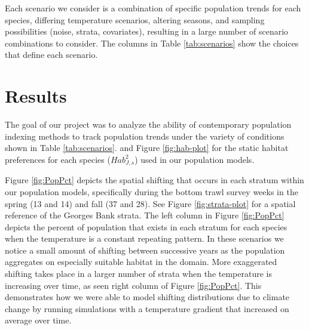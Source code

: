 \documentclass[
  12pt,
]{article}
\begin{document}
Each scenario we consider is a combination of specific population trends for each species, differing temperature scenarios, altering seasons, and sampling possibilities (noise, strata, covariates), resulting in a large number of scenario combinations to consider. The columns in Table \ref{tab:scenarios} show the choices that define each scenario.

\begin{table}

\caption{\label{tab:scenarios}Each index estimate chooses one condition from each of the following
7 columns. There are 3*3*2*2*2*2*2 = 288 VAST model combinations and 3*3*2*2*2*2 = 144 stratified mean estimates.}
\centering
{}
\end{table}

\section{Results}

The goal of our project was to analyze the ability of contemporary population indexing methods to track population trends under the variety of conditions shown in Table \ref{tab:scenarios}. and Figure \ref{fig:hab-plot} for the static habitat preferences for each species (\(Hab^2_{J,s}\)) used in our population models.

Figure \ref{fig:PopPct} depicts the spatial shifting that occurs in each stratum within our population models, specifically during the bottom trawl survey weeks in the spring (13 and 14) and fall (37 and 28). See Figure \ref{fig:strata-plot} for a spatial reference of the Georges Bank strata. The left column in Figure \ref{fig:PopPct} depicts the percent of population that exists in each stratum for each species when the temperature is a constant repeating pattern. In these scenarios we notice a small amount of shifting between successive years as the population aggregates on especially suitable habitat in the domain. More exaggerated shifting takes place in a larger number of strata when the temperature is increasing over time, as seen right column of Figure \ref{fig:PopPct}. This demonstrates how we were able to model shifting distributions due to climate change by running simulations with a temperature gradient that increased on average over time.
\end{document}
